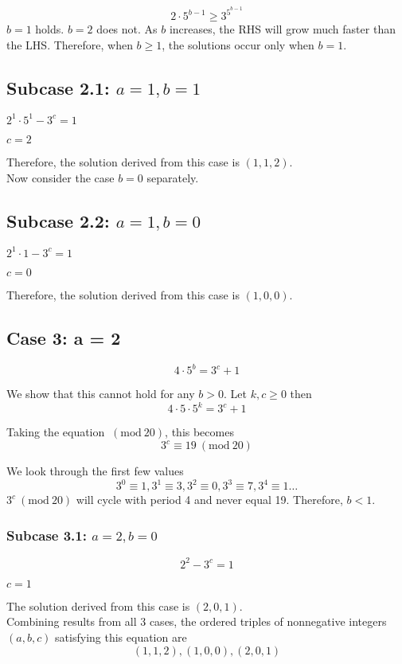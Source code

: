 \documentclass[11pt, letterpaper]{article}
\newcommand{\Mod}[1]{\ (\mathrm{mod}\ #1)}
\begin{document}
\begin{solution}{5}
$$2\cdot5^{b-1}\geq3^{5^{b-1}}$$ $b=1$ holds. $b=2$ does not. As $b$ increases, the RHS will grow much faster than the LHS. Therefore, when $b\geq1$, the solutions occur only when $b=1$.

\subsection*{Subcase 2.1: $a=1,b=1$}

$2^1\cdot5^1 - 3^c = 1$

$c=2$

Therefore, the solution derived from this case is $(1,1,2)$.\\

Now consider the case $b=0$ separately.

\subsection*{Subcase 2.2: $a=1,b=0$}

$2^1\cdot1 - 3^c = 1$

$c=0$

Therefore, the solution derived from this case is $(1,0,0)$.\\

\subsection*{Case 3: a = 2}

$$4\cdot5^b = 3^c + 1$$

We show that this cannot hold for any $b > 0$. Let $k,c\geq0$ then $$4\cdot5\cdot5^k = 3^c + 1$$

Taking the equation $\Mod{20}$, this becomes $$3^c \equiv 19 \Mod{20}$$

We look through the first few values $$3^0 \equiv 1, 3^1 \equiv 3, 3^2 \equiv 0, 3^3 \equiv 7, 3^4 \equiv 1\dotsc$$ $3^c \Mod{20}$ will cycle with period 4 and never equal 19. Therefore, $b < 1$. 

\subsubsection*{Subcase 3.1: $a=2,b=0$}

$$2^2 -3^c = 1$$
\begin{center}
$c = 1$
\end{center}

The solution derived from this case is $(2,0,1)$.\\

Combining results from all 3 cases, the ordered triples of nonnegative integers $(a,b,c)$ satisfying this equation are $$\boxed{(1,1,2), (1,0,0), (2,0,1)}$$

\end{solution}
\end{document}
